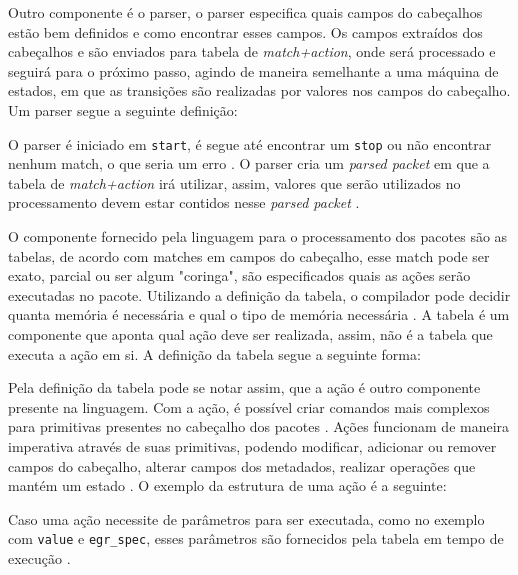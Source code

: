 \documentclass[
    12pt,
    openright, 
    oneside,
    a4paper,
    french,
    english,
    brazil
    ]{facom-ufu-abntex2}
\theoremstyle{definition}
\begin{document}


Outro componente é o parser, o parser especifica quais campos do cabeçalhos estão
bem definidos e como encontrar esses campos. Os campos extraídos dos cabeçalhos e 
são enviados para tabela de \textit{match+action}, onde será processado e seguirá
para o próximo passo, agindo de maneira semelhante a uma máquina de estados, em 
que as transições são realizadas por valores nos campos do cabeçalho. Um parser
segue a seguinte definição:



O parser é iniciado em \texttt{start}, é segue até encontrar um \texttt{stop} ou não
encontrar nenhum match, o que seria um erro \cite{bosshart2014p4}. O parser cria um 
\textit{parsed packet} em que a tabela de \textit{match+action} irá utilizar,
assim, valores que serão utilizados no processamento devem estar contidos nesse
\textit{parsed packet} \cite{p4USITutorial}.

O componente fornecido pela linguagem para o processamento dos pacotes são as tabelas,
de acordo com matches em campos do cabeçalho, esse match  pode ser exato, parcial 
ou ser algum "coringa", são especificados quais as ações serão executadas no
pacote. Utilizando a definição da tabela, o compilador pode decidir quanta memória 
é necessária e qual o tipo de memória necessária \cite{bosshart2014p4}. A
tabela é um componente que aponta qual ação deve ser realizada, assim, não é a 
tabela que executa a ação em si. A definição da tabela segue a seguinte forma:



Pela definição da tabela pode se notar assim, que a ação é outro componente presente
na linguagem. Com a ação, é possível criar comandos mais complexos para primitivas
presentes no cabeçalho dos pacotes \cite{bosshart2014p4}. Ações funcionam de
maneira imperativa através de suas primitivas, podendo modificar, adicionar ou 
remover campos do cabeçalho, alterar campos dos metadados, realizar operações
que mantém um estado \cite{p4USITutorial}. O exemplo da estrutura de uma ação
é a seguinte:



Caso uma ação necessite de parâmetros para ser executada, como no exemplo com
\texttt{value} e \texttt{egr\_spec}, esses parâmetros são fornecidos pela tabela em tempo 
de execução \cite{bosshart2014p4}.
\end{document}

